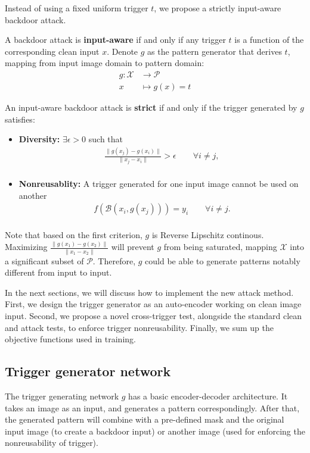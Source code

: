 Instead of using a fixed uniform trigger $t$, we propose a strictly input-aware backdoor attack.

\begin{definition}
A backdoor attack is \textbf{input-aware} if and only if any trigger $t$ is a function of the corresponding clean input $x$. Denote $g$ as the pattern generator that derives $t$, mapping from input image domain to pattern domain:
\begin{align*}
        g:\mathcal{X}&\longrightarrow\mathcal{P}\\
        x&\longmapsto g(x)=t
\end{align*}
\end{definition}

\begin{definition}
An input-aware backdoor attack is \textbf{strict} if and only if the trigger generated by $g$ satisfies:
\begin{itemize}
  \item \textbf{Diversity:}  $ \exists \epsilon > 0$ such that 
\begin{align*} 
\frac{\|g(x_j) - g(x_i)\|}{\|x_j - x_i\|} > \epsilon \quad\quad \forall i \neq j,\\
\end{align*}
\vspace{-12mm}
  \item \textbf{Nonreusablity:} A trigger generated for one input image cannot be used on another
\begin{align*}
f(\mathcal{B}(x_i,g(x_j))) = y_i \quad\quad \forall i \neq j.\\
\end{align*}
\end{itemize}
\end{definition}

Note that based on the first criterion, $g$ is Reverse Lipschitz continous. Maximizing $\frac{\|g(x_1)-g(x_2)\|}{\|x_1-x_2\|}$ will prevent $g$ from being saturated, mapping $\mathcal{X}$ into a significant subset of $\mathcal{P}$. Therefore, $g$ could be able to generate patterns notably different from input to input.

In the next sections, we will discuss how to implement the new attack method. First, we design the trigger generator as an auto-encoder working on clean image input. Second, we propose a novel cross-trigger test, alongside the standard clean and attack tests, to enforce trigger nonreusability. Finally, we sum up the objective functions used in training.
\subsection{Trigger generator network}
The trigger generating network $g$ has a basic encoder-decoder architecture. It takes an image as an input, and generates a pattern correspondingly. After that, the generated pattern will combine with a pre-defined mask and the original input image (to create a backdoor input) or another image (used for enforcing the nonreusability of trigger).

